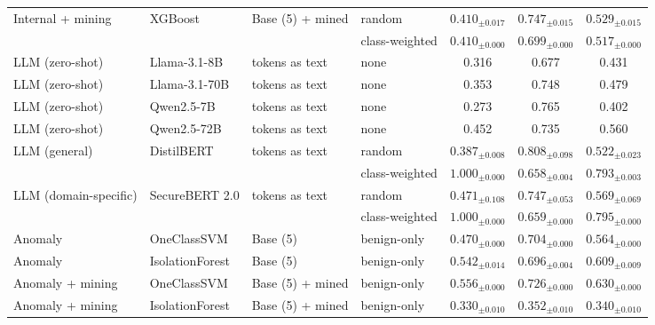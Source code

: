 \begin{table}[htbp]
{\begin{tabular}{llllccc}
\addlinespace
Internal + mining & XGBoost & Base (5) + mined & random & $0.410_{\pm 0.017}$ & $0.747_{\pm 0.015}$ & $0.529_{\pm 0.015}$ \\
 &  &  & class-weighted & $0.410_{\pm 0.000}$ & $0.699_{\pm 0.000}$ & $0.517_{\pm 0.000}$ \\
\midrule
LLM (zero-shot) & Llama-3.1-8B & tokens as text & none & 0.316 & 0.677 & 0.431 \\
\addlinespace
LLM (zero-shot) & Llama-3.1-70B & tokens as text & none & 0.353 & 0.748 & 0.479 \\
\addlinespace
LLM (zero-shot) & Qwen2.5-7B & tokens as text & none & 0.273 & 0.765 & 0.402 \\
\addlinespace
LLM (zero-shot) & Qwen2.5-72B & tokens as text & none & 0.452 & 0.735 & 0.560 \\
\addlinespace
LLM (general) & DistilBERT & tokens as text & random & $0.387_{\pm 0.008}$ & $0.808_{\pm 0.098}$ & $0.522_{\pm 0.023}$ \\
 &  &  & class-weighted & $1.000_{\pm 0.000}$ & $0.658_{\pm 0.004}$ & $0.793_{\pm 0.003}$ \\
\addlinespace
LLM (domain-specific) & SecureBERT 2.0 & tokens as text & random & $0.471_{\pm 0.108}$ & $0.747_{\pm 0.053}$ & $0.569_{\pm 0.069}$ \\
 &  &  & class-weighted & $1.000_{\pm 0.000}$ & $0.659_{\pm 0.000}$ & $0.795_{\pm 0.000}$ \\
\midrule
Anomaly & OneClassSVM & Base (5) & benign-only & $0.470_{\pm 0.000}$ & $0.704_{\pm 0.000}$ & $0.564_{\pm 0.000}$ \\
\addlinespace
Anomaly & IsolationForest & Base (5) & benign-only & $0.542_{\pm 0.014}$ & $0.696_{\pm 0.004}$ & $0.609_{\pm 0.009}$ \\
\addlinespace
Anomaly + mining & OneClassSVM & Base (5) + mined & benign-only & $0.556_{\pm 0.000}$ & $0.726_{\pm 0.000}$ & $0.630_{\pm 0.000}$ \\
\addlinespace
Anomaly + mining & IsolationForest & Base (5) + mined & benign-only & $0.330_{\pm 0.010}$ & $0.352_{\pm 0.010}$ & $0.340_{\pm 0.010}$ \\
\bottomrule
\end{tabular}%
}
\end{table}
